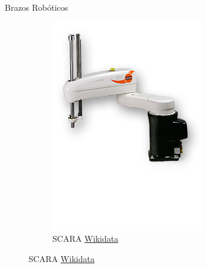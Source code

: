 \begin{frame}[fragile]{Brazos Robóticos}
\begin{figure}
\begin{subfigure}{0.33\textwidth}
		\includegraphics[scale=0.3]{./EtapaModerna/Imagenes/SCARA.jpg}
		\caption{SCARA \href{https://commons.wikimedia.org/wiki/File:KUKA_Industrial_Robot_KR10_SCARA.jpg}{Wikidata}}
	\end{subfigure}
\end{figure}
\end{frame}


